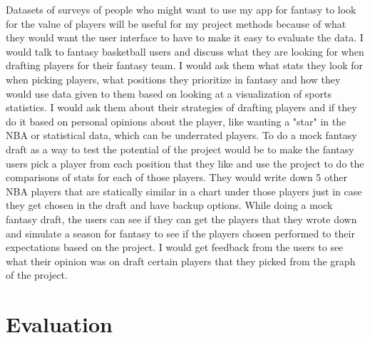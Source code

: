 \documentclass[10pt,twocolumn]{article}
\begin{document}
Datasets of surveys of people who might want to use my app for fantasy to look for the value of players will be useful for my project methods because of what they would want the user interface to have to make it easy to evaluate the data. I would talk to fantasy basketball users and discuss what they are looking for when drafting players for their fantasy team. I would ask them what stats they look for when picking players, what positions they prioritize in fantasy and how they would use data given to them based on looking at a visualization of sports statistics. I would ask them about their strategies of drafting players and if they do it based on personal opinions about the player, like wanting a "star" in the NBA or statistical data, which can be underrated players. To do a mock fantasy draft as a way to test the potential of the project would be to make the fantasy users pick a player from each position that they like and use the project to do the comparisons of stats for each of those players. They would write down 5 other NBA players that are statically similar in a chart under those players just in case they get chosen in the draft and have backup options. While doing a mock fantasy draft, the users can see if they can get the players that they wrote down and simulate a season for fantasy to see if the players chosen performed to their expectations based on the project. I would get feedback from the users to see what their opinion was on draft certain players that they picked from the graph of the project.  


\section{Evaluation}
\end{document}
